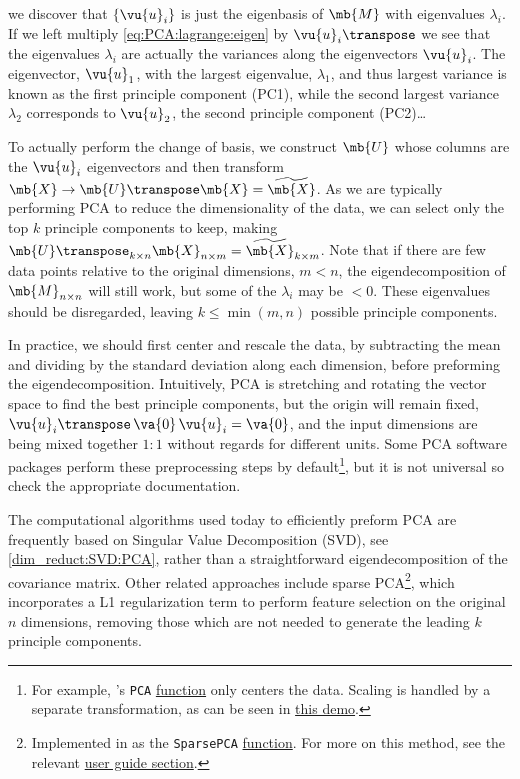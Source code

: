 \noindent we discover that $\left\{\vu{u}_{i}\right\}$
is just the eigenbasis of $\mb{M}$ with eigenvalues $\lambda_{i}$.
If we left multiply \cref{eq:PCA:lagrange:eigen} by $\vu{u}_{i}\transpose$
we see that the eigenvalues $\lambda_{i}$ are actually the variances along the eigenvectors $\vu{u}_{i}$.
The eigenvector, $\vu{u}_{1}$, with the largest eigenvalue, $\lambda_{1}$, and thus largest variance
is known as the first principle component (PC1),
while the second largest variance $\lambda_{2}$ corresponds to $\vu{u}_{2}$,
the second principle component (PC2)\ldots

To actually perform the change of basis,
we construct $\mb{U}$ whose columns are the $\vu{u}_{i}$ eigenvectors
and then transform $\mb{X} \to\mb{U}\transpose \mb{X} = \widetilde{\mb{X}}$.
As we are typically performing PCA to reduce the dimensionality of the data,
we can select only the top $k$ principle components to keep, making
$\mb{U}\transpose_{k \times n} \mb{X}_{n \times m} = \widetilde{\mb{X}}_{k \times m}$.
Note that if there are few data points relative to the original dimensions, $m < n$,
the eigendecomposition of $\mb{M}_{n \times n}$ will still work, but some of the $\lambda_{i}$ may be $< 0$.
These eigenvalues should be disregarded, leaving $k \leq \min\left(m,n\right)$ possible principle components.

In practice, we should first center and rescale the data,
by subtracting the mean and dividing by the standard deviation along each dimension,
before preforming the eigendecomposition.
Intuitively, PCA is stretching and rotating the vector space to find the best principle components,
but the origin will remain fixed, $\vu{u}_{i}\transpose\,\va{0}\,\vu{u}_{i} = \va{0}$,
and the input dimensions are being mixed together $1 \mathbin{:} 1$ without regards for different units.
Some PCA software packages perform these preprocessing steps by default\footnote{For example,
{\sklearn}'s \texttt{PCA}
\href{https://scikit-learn.org/stable/modules/generated/sklearn.decomposition.PCA.html}{function}
only centers the data.
Scaling is handled by a separate transformation, as can be seen in
\href{https://scikit-learn.org/stable/auto\_examples/preprocessing/plot\_scaling\_importance.html}{this demo}.},
but it is not universal so check the appropriate documentation.

The computational algorithms used today to efficiently preform PCA are
frequently based on Singular Value Decomposition (SVD), see \cref{dim_reduct:SVD:PCA},
rather than a straightforward eigendecomposition of the covariance matrix.
Other related approaches include sparse PCA\footnote{Implemented
in \sklearn as the \texttt{SparsePCA}
\href{https://scikit-learn.org/stable/modules/generated/sklearn.decomposition.SparsePCA.html}{function}.
For more on this method, see the relevant \sklearn
\href{https://scikit-learn.org/stable/modules/decomposition.html\#sparsepca}{user guide section}.},
which incorporates a L1 regularization term to perform feature selection on the original $n$ dimensions,
removing those which are not needed to generate the leading $k$ principle components.

